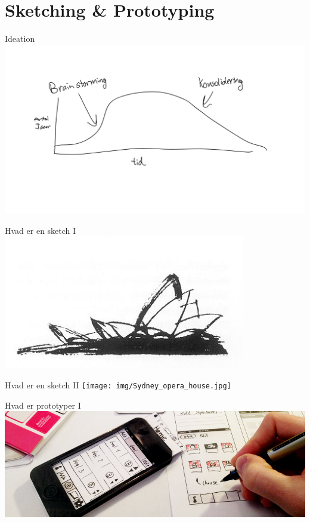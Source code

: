 \documentclass[10pt]{beamer}
\begin{document}
\section{Sketching \& Prototyping}

\begin{frame}{Ideation}
		\includegraphics[scale=0.18]{img/ideation.pdf}
\end{frame}

\begin{frame}{Hvad er en sketch I}
	\centering
	\includegraphics[width=\linewidth]{img/operasketch.jpg}
\end{frame}

\begin{frame}{Hvad er en sketch II}
	\centering
	\texttt{[image: img/Sydney\_opera\_house.jpg]}
\end{frame}

\begin{frame}{Hvad er prototyper I}
	\centering
	\includegraphics[width=\linewidth]{img/paperprotoyping.jpg}
\end{frame}
\end{document}
